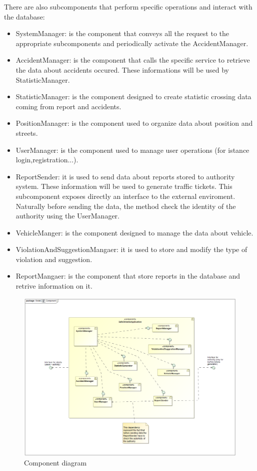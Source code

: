 There are also subcomponents that perform specific operations and interact with the database:
\begin{itemize}
 \item 
 SystemManager: is the component that conveys all the request to the appropriate subcomponents and periodically activate the AccidentManager.
 \item 
 AccidentManager: is the component that calls the specific service to retrieve the data about accidents occured. These informations will be used by StatisticManager.
 \item
 StatisticManager: is the component designed to create statistic crossing data coming from report and accidents.
 \item 
 PositionManager: is the component used to organize data about position and streets.
 \item 
 UserManager: is the component used to manage user operations (for istance login,registration...).
 \item
 ReportSender: it is used to send data about reports stored to authority system. These information will be used to generate traffic tickets. This subcomponent exposes directly an interface to the external enviroment. Naturally before sending the data, the method check the identity of the authority using the UserManager.
 \item 
 VehicleManger: is the component designed to manage the data about vehicle.
 \item 
 ViolationAndSuggestionMangaer: it is used to store and modify the type of violation and suggestion.
 \item 
 ReportMangaer: is the component that store reports in the database and retrive information on it.
 
\end{itemize}

\begin{figure}[H]
	\centering
	\includegraphics[width=1.12\linewidth]{Images/component.png}
	\caption{Component diagram}
\end{figure}


